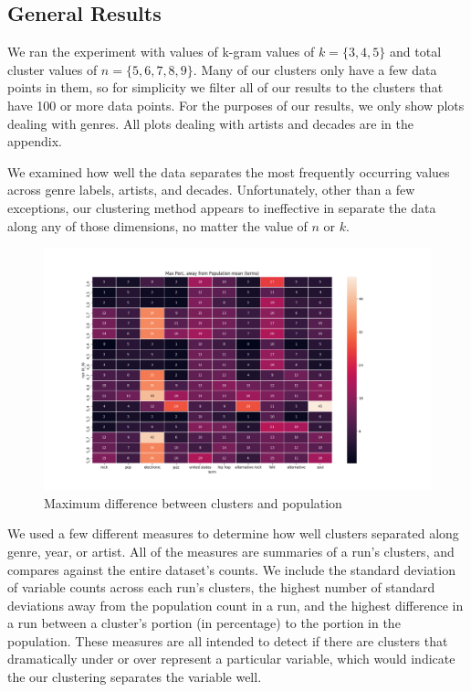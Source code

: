 \subsection{General Results}

We ran the experiment with values of k-gram values of $k=\{3,4,5\}$ and 
total cluster values of $n=\{5,6,7,8,9\}$.
Many of our clusters only have a few data points in them,
so for simplicity we filter all of our results to the clusters that have
100 or more data points.
For the purposes of our results, we only show plots dealing with genres.
All plots dealing with artists and decades are in the appendix.

We examined how well the data separates the most frequently occurring values
across genre labels, artists, and decades.
Unfortunately, other than a few exceptions, our clustering method appears to ineffective 
in separate the data along any of those dimensions, no matter the value of $n$ or $k$.

\begin{figure}[ht]
    \centering
    \includegraphics[width=1.2\textwidth]{perc_away_terms}
    \caption{Maximum difference between clusters and population}
    \label{fig:all}
\end{figure}

We used a few different measures to determine how well clusters separated along genre, year, or artist.
All of the measures are summaries of a run's clusters, and compares against the entire dataset's counts.
We include the standard deviation of variable counts across each run's clusters,
the highest number of standard deviations away from the population count in a run,
and the highest difference in a run between a cluster's portion (in percentage) to the portion in the population.
These measures are all intended to detect if there are clusters that dramatically under or over represent a particular variable,
which would indicate the our clustering separates the variable well.

